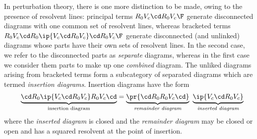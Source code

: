 \documentclass[11pt,fleqn]{article}
\numberwithin{equation}{section}
\begin{document}
\begin{dfn}
In perturbation theory, there is one more distinction to be made, owing to the presence of resolvent lines:
principal terms $R_0V_c\cd R_0V_c\F$ generate disconnected diagrams with one common set of resolvent lines, whereas bracketed terms $R_0V_c\cd R_0\ip{V_c\cd R_0V_c}\cd R_0V_c\F$ generate disconnected (and unlinked) diagrams whose parts have their own sets of resolvent lines.
In the second case, we refer to the disconnected parts as \textit{separate} diagrams, whereas in the first case we consider them parts to make up one \textit{combined} diagram.
The unliked diagrams arising from bracketed terms form a subcategory of separated diagrams which are termed \textit{insertion diagrams}.
Insertion diagrams have the form
\begin{align*}
&&
  \underset{
    \text{insertion diagram}
  }{\underbrace{
    \cd R_0\ip{V_c\cd R_0V_c}R_0V_c\cd 
  }}
=
  \underset{
    \textit{remainder diagram}
  }{\underbrace{
    \pr{
      \cd R_0R_0V_c\cd
    }
  }}\hspace{5pt}
  \underset{
    \textit{inserted diagram}
  }{\underbrace{
    \ip{V_c\cd R_0V_c}
  }}
\end{align*}
where the \textit{inserted diagram} is closed and the \textit{remainder diagram} may be closed or open and has a squared resolvent at the point of insertion.
\end{dfn}
\end{document}

